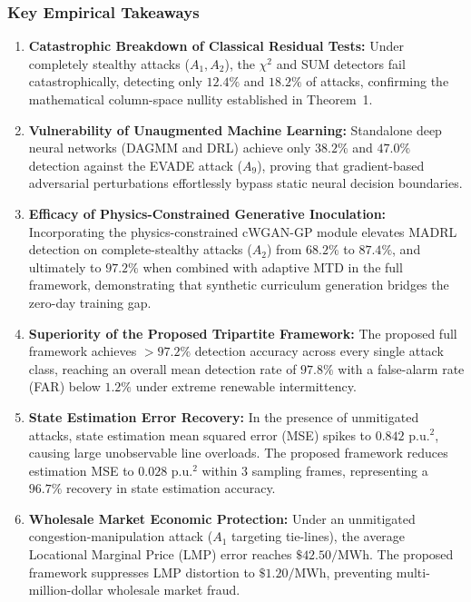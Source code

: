 \documentclass[journal,compsoc]{IEEEtran}
\begin{document}
\subsubsection{Key Empirical Takeaways}
\begin{enumerate}
    \item \textbf{Catastrophic Breakdown of Classical Residual Tests:} Under completely stealthy attacks ($A_1, A_2$), the $\chi^2$ and SUM detectors fail catastrophically, detecting only $12.4\%$ and $18.2\%$ of attacks, confirming the mathematical column-space nullity established in Theorem~1.
    \item \textbf{Vulnerability of Unaugmented Machine Learning:} Standalone deep neural networks (DAGMM and DRL) achieve only $38.2\%$ and $47.0\%$ detection against the EVADE attack ($A_9$), proving that gradient-based adversarial perturbations effortlessly bypass static neural decision boundaries.
    \item \textbf{Efficacy of Physics-Constrained Generative Inoculation:} Incorporating the physics-constrained cWGAN-GP module elevates MADRL detection on complete-stealthy attacks ($A_2$) from $68.2\%$ to $87.4\%$, and ultimately to $97.2\%$ when combined with adaptive MTD in the full framework, demonstrating that synthetic curriculum generation bridges the zero-day training gap.
    \item \textbf{Superiority of the Proposed Tripartite Framework:} The proposed full framework achieves $>97.2\%$ detection accuracy across every single attack class, reaching an overall mean detection rate of $97.8\%$ with a false-alarm rate (FAR) below $1.2\%$ under extreme renewable intermittency.
    \item \textbf{State Estimation Error Recovery:} In the presence of unmitigated attacks, state estimation mean squared error (MSE) spikes to $0.842\text{ p.u.}^2$, causing large unobservable line overloads. The proposed framework reduces estimation MSE to $0.028\text{ p.u.}^2$ within 3 sampling frames, representing a $96.7\%$ recovery in state estimation accuracy.
    \item \textbf{Wholesale Market Economic Protection:} Under an unmitigated congestion-manipulation attack ($A_1$ targeting tie-lines), the average Locational Marginal Price (LMP) error reaches $\$42.50\text{/MWh}$. The proposed framework suppresses LMP distortion to $\$1.20\text{/MWh}$, preventing multi-million-dollar wholesale market fraud.
\end{enumerate}
\end{document}
